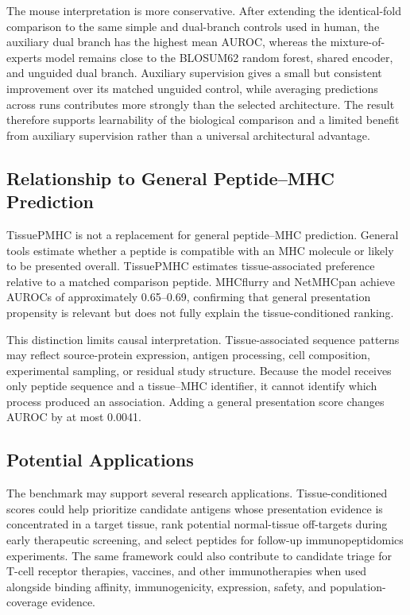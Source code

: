 The mouse interpretation is more conservative. After extending the identical-fold comparison to the same simple and dual-branch controls used in human, the auxiliary dual branch has the highest mean AUROC, whereas the mixture-of-experts model remains close to the BLOSUM62 random forest, shared encoder, and unguided dual branch. Auxiliary supervision gives a small but consistent improvement over its matched unguided control, while averaging predictions across runs contributes more strongly than the selected architecture. The result therefore supports learnability of the biological comparison and a limited benefit from auxiliary supervision rather than a universal architectural advantage.

\subsection{Relationship to General Peptide--MHC Prediction}

TissuePMHC is not a replacement for general peptide--MHC prediction. General tools estimate whether a peptide is compatible with an MHC molecule or likely to be presented overall. TissuePMHC estimates tissue-associated preference relative to a matched comparison peptide. MHCflurry and NetMHCpan achieve AUROCs of approximately 0.65--0.69, confirming that general presentation propensity is relevant but does not fully explain the tissue-conditioned ranking.

This distinction limits causal interpretation. Tissue-associated sequence patterns may reflect source-protein expression, antigen processing, cell composition, experimental sampling, or residual study structure. Because the model receives only peptide sequence and a tissue--MHC identifier, it cannot identify which process produced an association. Adding a general presentation score changes AUROC by at most 0.0041.

\subsection{Potential Applications}

The benchmark may support several research applications. Tissue-conditioned scores could help prioritize candidate antigens whose presentation evidence is concentrated in a target tissue, rank potential normal-tissue off-targets during early therapeutic screening, and select peptides for follow-up immunopeptidomics experiments. The same framework could also contribute to candidate triage for T-cell receptor therapies, vaccines, and other immunotherapies when used alongside binding affinity, immunogenicity, expression, safety, and population-coverage evidence.

